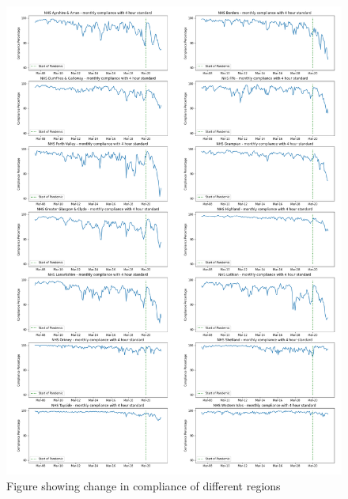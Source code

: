 \documentclass[11pt,a4paper]{article}
\begin{document}
\begin{figure}[H]
  \centering
  \includegraphics[width=\linewidth]{Monthly_compliance_area_wise.png}
  \caption{Figure showing change in compliance of different regions }
\end{figure}

\newpage
\printbibliography
\end{document}
